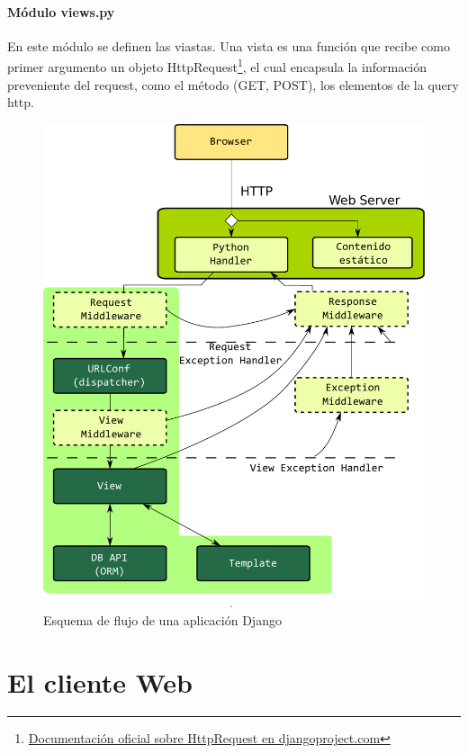 \documentclass[a4paper]{report}
\begin{document}
\subsubsection*{Módulo views.py}
En este módulo se definen las viastas. Una vista es una función que recibe como
primer
argumento un objeto HttpRequest\footnote{
\href{
http://docs.djangoproject.com/en/dev/ref/request-response/\#httprequest-objects}
{Documentación oficial sobre HttpRequest en djangoproject.com}}, el cual
encapsula la información preveniente del request, 
como el método (GET, POST), los elementos de la query http.
\begin{figure}[htp]
\centering
\includegraphics[scale=0.40]{img/django_strucure.pdf}
\caption{Esquema de flujo de una aplicación Django}\label{fig:erptsqfit}
\end{figure}


\chapter{El cliente Web}
\end{document}
